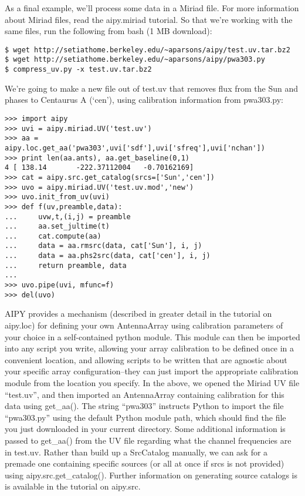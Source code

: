 As a final example, we'll process some data in a Miriad file.
For more information about Miriad files, read the
aipy.miriad tutorial.  So that we're working with the same files, run the
following from bash (1 MB download):

\begin{verbatim}
$ wget http://setiathome.berkeley.edu/~aparsons/aipy/test.uv.tar.bz2
$ wget http://setiathome.berkeley.edu/~aparsons/aipy/pwa303.py
$ compress_uv.py -x test.uv.tar.bz2
\end{verbatim}

We're going to make a new file out of test.uv that removes flux from the
Sun and phases to Centaurus A (`cen'), using calibration information from
pwa303.py: 

\begin{verbatim}
>>> import aipy
>>> uvi = aipy.miriad.UV('test.uv')
>>> aa = aipy.loc.get_aa('pwa303',uvi['sdf'],uvi['sfreq'],uvi['nchan'])
>>> print len(aa.ants), aa.get_baseline(0,1)
4 [ 138.14       -222.37112004   -0.70162169]
>>> cat = aipy.src.get_catalog(srcs=['Sun','cen'])
>>> uvo = aipy.miriad.UV('test.uv.mod','new')
>>> uvo.init_from_uv(uvi)
>>> def f(uv,preamble,data):
...     uvw,t,(i,j) = preamble
...     aa.set_jultime(t)
...     cat.compute(aa)
...     data = aa.rmsrc(data, cat['Sun'], i, j)
...     data = aa.phs2src(data, cat['cen'], i, j)
...     return preamble, data
... 
>>> uvo.pipe(uvi, mfunc=f)
>>> del(uvo)
\end{verbatim}

AIPY provides a mechanism (described in greater detail in the tutorial on
aipy.loc)
for defining your own AntennaArray using calibration parameters of your choice
in a self-contained python module.  This module can then be imported into
any script you write, allowing your array calibration to be defined once in
a convenient location, and allowing scripts to be written
that are agnostic about your specific array configuration--they can just
import the appropriate calibration module from the location you specify.
In the above, we opened the Miriad UV file ``test.uv'', and then imported
an AntennaArray containing calibration for this data using get\_aa().
The string ``pwa303'' instructs Python to import the file ``pwa303.py'' using
the default Python module path, which should find the file you just downloaded
in your current directory.
Some additional information is passed to get\_aa() from the UV file regarding
what the channel frequencies are in test.uv. Rather than build up a
SrcCatalog manually, we can ask for a premade one containing specific sources
(or all at once if srcs is not provided) using aipy.src.get\_catalog().
Further information on generating source catalogs is is available in the
tutorial on aipy.src.

